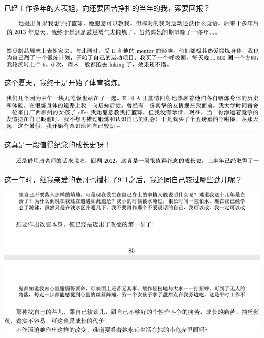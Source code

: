 \documentclass[9pt, b5paper]{article}
\begin{document}
已经工作多年的大表姐，向还要困苦挣扎的当年的我，索要回报？

\begin{center}
\includegraphics[width=.9\linewidth]{./pic/backups_plans_20210507_141657.png}
\end{center}

\begin{center}
\includegraphics[width=.9\linewidth]{./pic/backups_plans_20210507_092117.png}
\end{center}

这个夏天，我终于是开始了体育锻炼。

\begin{center}
\includegraphics[width=.9\linewidth]{./pic/backups_plans_20210422_184628.png}
\end{center}

这真是一段值得纪念的成长史呀！

\begin{center}
\includegraphics[width=.9\linewidth]{./pic/backups_plans_20210507_142127.png}
\end{center}

这一年时，继我亲爱的表哥也播打了911之后，我还同自己较过哪些劲儿呢？

\begin{center}
\includegraphics[width=.9\linewidth]{./pic/backups_plans_20210507_142503.png}
\end{center}
\end{document}
